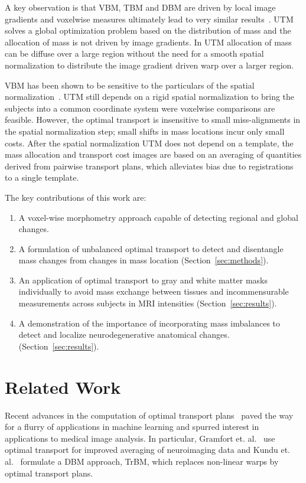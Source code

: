 \documentclass{llncs}
\begin{document}
A key observation is that VBM, TBM and DBM are driven by local image gradients
and voxelwise measures ultimately lead to very similar
results~\cite[Chaper~6]{frackowiak2004human}.  UTM solves a global optimization
problem based on the distribution of mass and the allocation of mass is not
driven by image gradients. In UTM allocation of mass can be diffuse over a
large region without the need for a smooth spatial normalization to distribute
the image gradient driven warp over a larger region. 

VBM has been shown to be sensitive to the particulars of the spatial
normalization~\cite{bookstein2001voxel,davatzikos2004voxel}. UTM still depends
on a rigid spatial normalization to bring the subjects into a common coordinate
system were voxelwise comparisons are feasible. However, the optimal transport
is insensitive to small miss-alignments in the spatial normalization step;
small shifts in mass locations incur only small costs.  After the spatial
normalization UTM does not depend on a template, the mass allocation and
transport cost images are based on an averaging of quantities derived from
pairwise transport plans, which alleviates bias due to registrations to a
single template. 

The key contributions of this work are:
\vspace{-1mm}
\begin{enumerate}
\item A voxel-wise morphometry approach capable of detecting regional and
  global changes.  
\item A formulation of unbalanced optimal transport to detect and disentangle mass
  changes from changes in mass location (Section~\ref{sec:methods}).
\item An application of optimal transport to gray and white matter masks
  individually to avoid mass exchange between tissues and incommensurable
  measurements across subjects in MRI intensities (Section~\ref{sec:results}).
\item A demonstration of the importance of incorporating mass imbalances to
  detect and localize neurodegenerative anatomical changes.
  (Section~\ref{sec:results}).  
\end{enumerate}


\section{Related Work}
Recent advances in the computation of optimal transport
plans~\cite{cuturi2013sinkhorn,gerber2017multiscale} paved the way for a flurry
of applications in machine learning and spurred interest in applications to
medical image analysis. In particular, Gramfort et.
al.~\cite{gramfort2015fast} use optimal transport for improved averaging of
neuroimaging data and Kundu et.  al.~\cite{kundu2018discovery} formulate a DBM
approach, TrBM, which replaces non-linear warps by optimal transport plans. 
\end{document}
